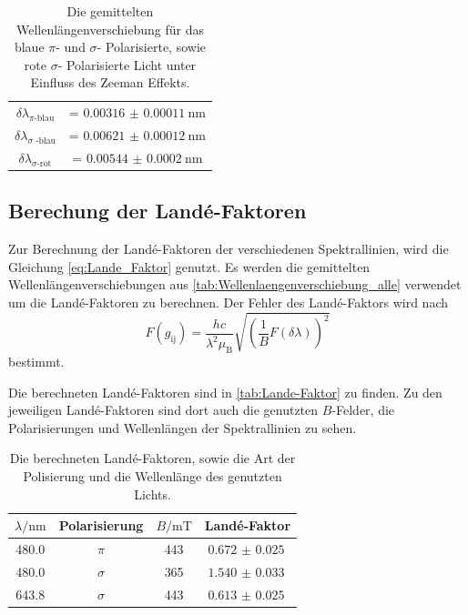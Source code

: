 \begin{table}
    \centering
    \caption{Die gemittelten Wellenlängenverschiebung für das blaue $\pi$- und $\sigma$- Polarisierte, sowie rote $\sigma$- Polarisierte Licht unter Einfluss des Zeeman Effekts.}
    \begin{tabular}{cc}
        \midrule
        $\delta \lambda _\text{$\pi$-blau}$ &= $\SI{0.00316(011)}{\nano\meter}$ \\
        $\delta \lambda _\text{$\sigma$ -blau}$ &= $\SI{0.00621(012)}{\nano\meter}$ \\
        $\delta \lambda _\text{$\sigma$-rot}$ &=  $\SI{0.00544(020)}{\nano\meter}$ \\
        \bottomrule
    \end{tabular}
    \label{tab:Wellenlaengenverschiebung_alle}
\end{table}

\subsection{Berechung der Landé-Faktoren}

Zur Berechnung der Landé-Faktoren der verschiedenen Spektrallinien, wird die Gleichung \eqref{eq:Lande_Faktor} genutzt.
Es werden die gemittelten Wellenlängenverschiebungen aus \autoref{tab:Wellenlaengenverschiebung_alle} verwendet um die Landé-Faktoren zu berechnen.
Der Fehler des Landé-Faktors wird nach
\begin{equation*}
    F(g_\text{ij}) = \frac{hc}{\lambda^2 \mu _\text{B}} \sqrt{\left ( \frac{1}{B} F(\delta \lambda) \right)^2}
\end{equation*}
bestimmt.

Die berechneten Landé-Faktoren sind in \autoref{tab:Lande-Faktor} zu finden.
Zu den jeweiligen Landé-Faktoren sind dort auch die genutzten $B$-Felder, die Polarisierungen und Wellenlängen der Spektrallinien zu sehen.

\begin{table}
    \centering
    \caption{Die berechneten Landé-Faktoren, sowie die Art der Polisierung und die Wellenlänge des genutzten Lichts.}
    \begin{tabular}{cccc}
        \toprule
        $\lambda / \si{\nano\meter}$ & Polarisierung & $B / \si{\milli\tesla}$ & Landé-Faktor \\
        \midrule
        480.0 & $\pi$ & 443 & $\SI{0.672(25)}{}$ \\
        480.0 & $\sigma$ & 365 & $\SI{1.540(33)}{}$ \\
        643.8 & $\sigma$ & 443 & $\SI{0.613(25)}{}$ \\
        \bottomrule
    \end{tabular}
    \label{tab:Lande-Faktor}
\end{table}

